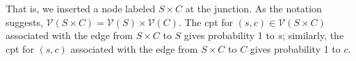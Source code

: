 \documentclass{article}
\newcommand{\V}{\mathcal V}
\numberwithin{equation}{section}
\begin{document}
\begin{notfocus}
\begin{center}
{}
	\end{center}
That is, we inserted a node labeled $S \times C$ at the junction.  As
the notation suggests, $\V( S \times C) = \V(S) \times \V(C)$.
The cpt for $(s,c) \in \V(S \times C)$  associated with 
the edge from $S \times C$ to $S$ gives probability 1 to $s$;
similarly, the cpt for $(s,c)$  associated with 
the edge from $S \times C$ to $C$ gives probability 1 to $c$.


\end{notfocus}
\end{document}
